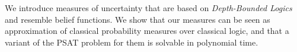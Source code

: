 
We introduce measures of uncertainty that are based on {\em Depth-Bounded Logics} \cite{DFG13} and resemble belief functions. We show that our measures can be seen as approximation of classical probability measures over classical logic, and that 
a variant of the PSAT \cite{hansen2000} problem for them is solvable in polynomial time. 

